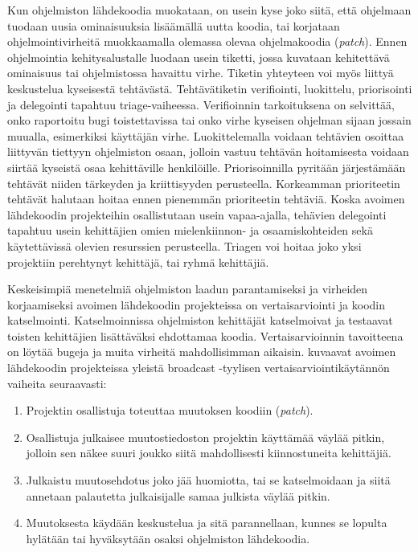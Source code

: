 \documentclass[utf8]{gradu3}
\begin{document}
Kun ohjelmiston lähdekoodia muokataan, on usein kyse joko siitä, että ohjelmaan
tuodaan uusia ominaisuuksia lisäämällä uutta koodia, tai korjataan
ohjelmointivirheitä muokkaamalla olemassa olevaa ohjelmakoodia (\textit{patch}).
Ennen ohjelmointia kehitysalustalle luodaan usein tiketti, jossa kuvataan
kehitettävä ominaisuus tai ohjelmistossa havaittu virhe. Tiketin yhteyteen voi
myös liittyä keskustelua kyseisestä tehtävästä.%
Tehtävätiketin verifiointi, luokittelu, priorisointi ja delegointi tapahtuu
triage-vaiheessa.%
Verifioinnin tarkoituksena on selvittää, onko raportoitu bugi toistettavissa tai
onko virhe kyseisen ohjelman sijaan jossain muualla, esimerkiksi käyttäjän
virhe.%
Luokittelemalla voidaan tehtävien osoittaa liittyvän tiettyyn ohjelmiston osaan,
jolloin vastuu tehtävän hoitamisesta voidaan siirtää kyseistä osaa kehittäville
henkilöille.%
Priorisoinnilla pyritään järjestämään tehtävät niiden tärkeyden ja kriittisyyden
perusteella. Korkeamman prioriteetin tehtävät halutaan hoitaa ennen pienemmän
prioriteetin tehtäviä.%
Koska avoimen lähdekoodin projekteihin osallistutaan usein vapaa-ajalla,
tehävien delegointi tapahtuu usein kehittäjien omien mielenkiinnon- ja
osaamiskohteiden sekä käytettävissä olevien resurssien perusteella.%
Triagen voi hoitaa joko yksi projektiin perehtynyt kehittäjä, tai ryhmä
kehittäjiä.

Keskeisimpiä menetelmiä ohjelmiston laadun parantamiseksi ja virheiden
korjaamiseksi avoimen lähdekoodin projekteissa on vertaisarviointi ja
koodin katselmointi. \parencite{Rigby-2014} Katselmoinnissa ohjelmiston
kehittäjät katselmoivat ja testaavat toisten kehittäjien lisättäväksi
ehdottamaa koodia. Vertaisarvioinnin tavoitteena on löytää bugeja ja
muita virheitä mahdollisimman aikaisin. \textcite{Rigby-2014} kuvaavat avoimen
lähdekoodin projekteissa yleistä broadcast -tyylisen vertaisarviointikäytännön
vaiheita seuraavasti:
\begin{enumerate}
  \item Projektin osallistuja toteuttaa muutoksen koodiin (\textit{patch}).
  \item Osallistuja julkaisee muutostiedoston projektin käyttämää väylää pitkin,
        jolloin sen näkee suuri joukko siitä mahdollisesti kiinnostuneita
        kehittäjiä.
  \item Julkaistu muutosehdotus joko jää huomiotta, tai se katselmoidaan ja siitä
        annetaan palautetta julkaisijalle samaa julkista väylää pitkin.
  \item Muutoksesta käydään keskustelua ja sitä parannellaan, kunnes se lopulta
        hylätään tai hyväksytään osaksi ohjelmiston lähdekoodia.
\end{enumerate}
\end{document}
